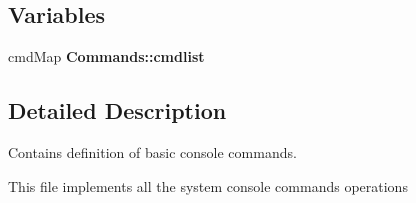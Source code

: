 \subsection*{Variables}
\begin{DoxyCompactItemize}
\item 
cmd\+Map {\bfseries Commands\+::cmdlist}\hypertarget{Commands_8hh_a858b3a3d3caa824a70c877892ff9e2a4}{}\label{Commands_8hh_a858b3a3d3caa824a70c877892ff9e2a4}

\end{DoxyCompactItemize}


\subsection{Detailed Description}
Contains definition of basic console commands. 

This file implements all the system console commands operations 